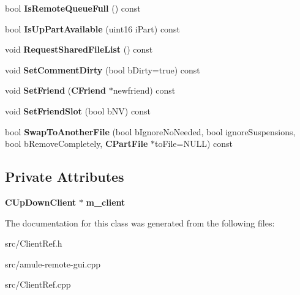 \begin{DoxyCompactItemize}
\item 
bool {\bfseries IsRemoteQueueFull} () const \label{classCClientRef_a905be2689eb60e1ed5ac96d1b24e6bde}

\item 
bool {\bfseries IsUpPartAvailable} (uint16 iPart) const \label{classCClientRef_a05fb88ea4e3f7a3a244fd591efe9591c}

\item 
void {\bfseries RequestSharedFileList} () const \label{classCClientRef_ae83ca836972cf644b5f86ec0732df9fc}

\item 
void {\bfseries SetCommentDirty} (bool bDirty=true) const \label{classCClientRef_ae0e74d55329a85decf62bc9b13bf4c61}

\item 
void {\bfseries SetFriend} ({\bf CFriend} $\ast$newfriend) const \label{classCClientRef_a92670535e2645f39bdfe47a382adbc32}

\item 
void {\bfseries SetFriendSlot} (bool bNV) const \label{classCClientRef_a479c05e4ede329eb90db340fe0e29218}

\item 
bool {\bfseries SwapToAnotherFile} (bool bIgnoreNoNeeded, bool ignoreSuspensions, bool bRemoveCompletely, {\bf CPartFile} $\ast$toFile=NULL) const \label{classCClientRef_ab148978a69bb8b2f27d7e3e7e1a6fb4a}

\end{DoxyCompactItemize}
\subsection*{Private Attributes}
\begin{DoxyCompactItemize}
\item 
{\bf CUpDownClient} $\ast$ {\bfseries m\_\-client}\label{classCClientRef_a7b600fde8fa72f8e4a5fd8a5480e634d}

\end{DoxyCompactItemize}


The documentation for this class was generated from the following files:\begin{DoxyCompactItemize}
\item 
src/ClientRef.h\item 
src/amule-\/remote-\/gui.cpp\item 
src/ClientRef.cpp\end{DoxyCompactItemize}
